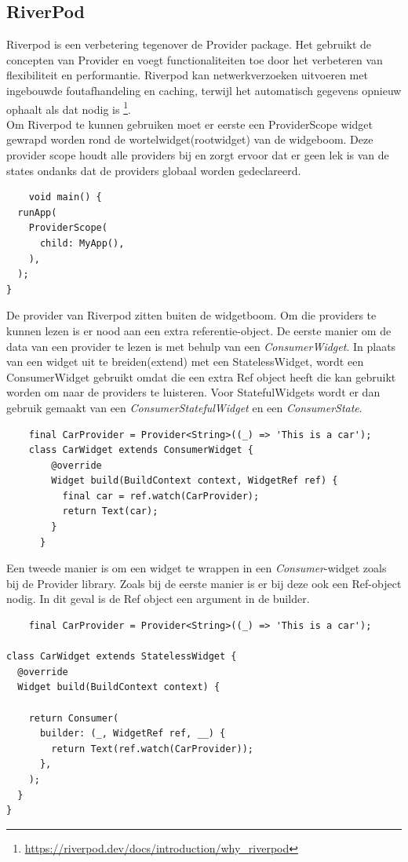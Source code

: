 \subsection{{RiverPod}}%
\label{sec:RiverPod}
Riverpod is een verbetering tegenover de Provider package. Het gebruikt de concepten van Provider en voegt functionaliteiten toe door het verbeteren van flexibiliteit en performantie.\autocite{Arsha2021} 
Riverpod kan netwerkverzoeken uitvoeren met ingebouwde foutafhandeling en caching, terwijl het automatisch gegevens opnieuw ophaalt als dat nodig is \footnote{\url{https://riverpod.dev/docs/introduction/why_riverpod}}.
\\
Om Riverpod te kunnen gebruiken moet er eerste een ProviderScope widget gewrapd worden rond de wortelwidget(rootwidget) van de widgeboom. Deze provider scope houdt alle providers bij en zorgt ervoor dat er geen lek is van de states ondanks dat de providers globaal worden gedeclareerd.
\begin{verbatim}
    void main() {
  runApp(
    ProviderScope(
      child: MyApp(),
    ),
  );
}
\end{verbatim}
De provider van Riverpod zitten buiten de widgetboom. Om die providers te kunnen lezen is er nood aan een extra referentie-object. 
De eerste manier om de data van een provider te lezen is met behulp van een \textit{ConsumerWidget}. In plaats van een widget uit te breiden(extend) met een StatelessWidget, 
wordt een ConsumerWidget gebruikt omdat die een extra Ref object heeft die kan gebruikt worden om naar de providers te luisteren. Voor StatefulWidgets wordt er dan gebruik
gemaakt van een \textit{ConsumerStatefulWidget} en een \textit{ConsumerState}.
\begin{verbatim}
    final CarProvider = Provider<String>((_) => 'This is a car');
    class CarWidget extends ConsumerWidget {
        @override
        Widget build(BuildContext context, WidgetRef ref) {
          final car = ref.watch(CarProvider);
          return Text(car);
        }
      }
\end{verbatim}
Een tweede manier is om een widget te wrappen in een \textit{Consumer}-widget zoals bij de Provider library. Zoals bij de eerste manier is er bij deze ook een Ref-object nodig. In dit geval is de 
Ref object een argument in de builder.
\begin{verbatim}
    final CarProvider = Provider<String>((_) => 'This is a car');
    
class CarWidget extends StatelessWidget {
  @override
  Widget build(BuildContext context) {
   
    return Consumer(
      builder: (_, WidgetRef ref, __) {
        return Text(ref.watch(CarProvider));
      },
    );
  }
}
\end{verbatim}

